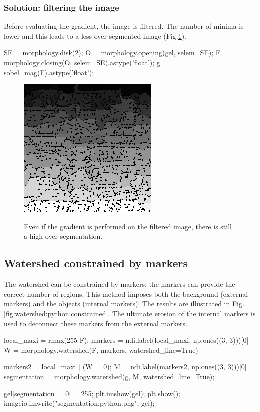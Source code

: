 \subsubsection{Solution: filtering the image}
Before evaluating the gradient, the image is filtered. The number of minima is lower and this leads to a less over-segmented image (Fig.\ref{fig:watershed:python:wat_filtered}).

\begin{python}
SE = morphology.disk(2);
O = morphology.opening(gel, selem=SE);
F = morphology.closing(O,   selem=SE).astype('float');
g = sobel_mag(F).astype('float');
\end{python}

\vspace*{-8pt}

\begin{figure}[htbp]
 \centering\caption{Even if the gradient is performed on the filtered image, there is still a high over-segmentation.}%
 \includegraphics[width=.28\linewidth]{gel_gradient_filtered.python.png}%
 \label{fig:watershed:python:wat_filtered}%
\end{figure}

\vspace*{-15pt}

\subsection{Watershed constrained by markers}
The watershed can be constrained by markers: the markers can provide the correct number of regions. This method imposes both the background
(external markers) and the objects (internal markers). The results are illustrated in Fig.\ref{fig:watershed:python:constrained}.
The ultimate erosion of the internal markers is used to deconnect these markers from the external markers.

\begin{python}
local_maxi = rmax(255-F);
markers = ndi.label(local_maxi, np.ones((3, 3)))[0]
W = morphology.watershed(F, markers, watershed_line=True)

markers2 = local_maxi | (W==0);
M = ndi.label(markers2, np.ones((3, 3)))[0]
segmentation = morphology.watershed(g, M, watershed_line=True);

gel[segmentation==0] = 255;
plt.imshow(gel);
plt.show();
imageio.imwrite("segmentation.python.png", gel);
\end{python}

